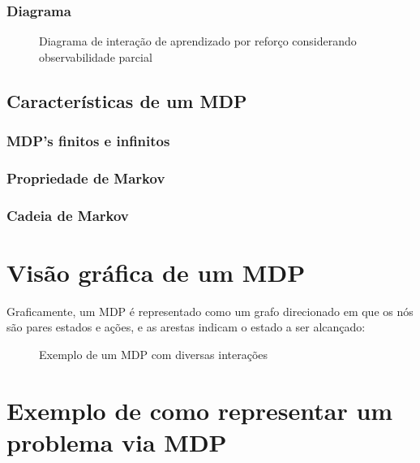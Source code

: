 \documentclass{article}
\begin{document}
            \subsubsection{Diagrama}

            \begin{figure}[ht]
                \centering
                \rlinteractionpomdp
                \caption{Diagrama de interação de aprendizado por reforço considerando observabilidade parcial}
                \label{diag:po-rl}
            \end{figure}

        \subsection{Características de um MDP}
        
            \subsubsection{MDP's finitos e infinitos}
            
            \subsubsection{Propriedade de Markov}
            
            \subsubsection{Cadeia de Markov}
        
    \section{Visão gráfica de um MDP}
    
        Graficamente, um MDP é representado como um grafo direcionado em que os nós são pares estados e ações, e as arestas indicam o estado a ser alcançado:
    
        \begin{figure}[ht]
            \centering
            \mdpbig
            \caption{Exemplo de um MDP com diversas interações}
            \label{diag:mdp-big}
        \end{figure}
        
    \section{Exemplo de como representar um problema via MDP}
    
\end{document}
